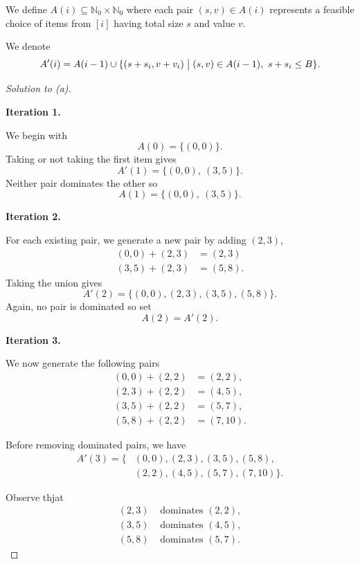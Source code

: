 \documentclass[11pt]{article}
\begin{document}
We define $A(i) \subseteq \mathbb N_0 \times 
\mathbb N_0$ where each pair 
$(s,v) \in A(i)$ represents a feasible choice 
of items from $[i]$ having total size $s$ and 
value $v$. 

We denote 
\[
    A'(i) = A(i-1) \cup \{(s + s_i, v + v_i) 
    \bigm| (s,v) \in A(i-1), \ s+s_i \leq B\}. 
\]

\begin{proof}[Solution to (a)]
    \medskip 
    \ 

    \textbf{Iteration 1.}

    We begin with 
    \[
        A(0) = \{(0,0)\}. 
    \]
    Taking or not taking the first item gives 
    \[
        A'(1) = \{(0,0), \ (3,5)\}.
    \]
    Neither pair dominates the other so 
    \[
        A(1) = \{(0,0), \ (3,5)\}. 
    \]

    \textbf{Iteration 2.}

    For each existing pair, we generate 
    a new pair by adding $(2,3)$, 
    \begin{align*}
        (0,0) + (2,3) &= (2,3) \\ 
        (3,5) + (2,3) &= (5,8). 
    \end{align*}
    Taking the union gives 
    \[  
        A'(2) = \{(0,0), (2,3), (3,5), (5,8)\}. 
    \]
    Again, no pair is dominated so set 
    \[
        A(2) = A'(2). 
    \]

    \textbf{Iteration 3.}

    We now generate the following pairs 
    \begin{align*}
        (0,0)+(2,2)&=(2,2),\\
        (2,3)+(2,2)&=(4,5),\\
        (3,5)+(2,2)&=(5,7),\\
        (5,8)+(2,2)&=(7,10).
    \end{align*}

    Before removing dominated pairs, we have 
    \[
        \begin{aligned}
        A'(3)=\{&
        (0,0),(2,3),(3,5),(5,8),\\
        &(2,2),(4,5),(5,7),(7,10)
        \}.
        \end{aligned}
    \]

    Observe thjat 
    \[
        \begin{aligned}
        (2,3)&\text{ dominates }(2,2),\\
        (3,5)&\text{ dominates }(4,5),\\
        (5,8)&\text{ dominates }(5,7).
        \end{aligned}
    \]


\end{proof}
\end{document}
